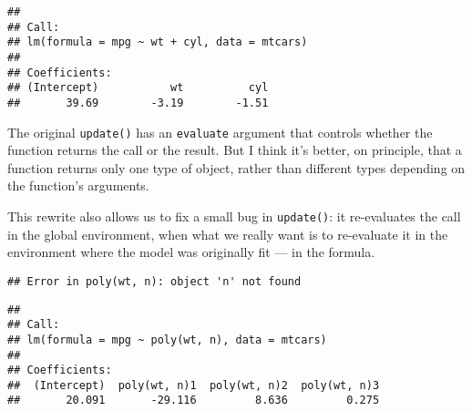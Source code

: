 \begin{verbatim}
## 
## Call:
## lm(formula = mpg ~ wt + cyl, data = mtcars)
## 
## Coefficients:
## (Intercept)           wt          cyl  
##       39.69        -3.19        -1.51
\end{verbatim}

The original \texttt{update()} has an \texttt{evaluate} argument that
controls whether the function returns the call or the result. But I
think it's better, on principle, that a function returns only one type
of object, rather than different types depending on the function's
arguments.

This rewrite also allows us to fix a small bug in \texttt{update()}: it
re-evaluates the call in the global environment, when what we really
want is to re-evaluate it in the environment where the model was
originally fit --- in the formula.

\begin{Shaded}
\begin{Highlighting}[]
\StringTok{ }\NormalTok{() \{}
\StringTok{ }
  \OperatorTok{~}\StringTok{ }
\NormalTok{\}}
\StringTok{ }\NormalTok{()}
\end{Highlighting}
\end{Shaded}

\begin{verbatim}
## Error in poly(wt, n): object 'n' not found
\end{verbatim}

\begin{Shaded}
\begin{Highlighting}[]
\StringTok{ }
\StringTok{ }
  \NormalTok{(}
\NormalTok{\}}
\end{Highlighting}
\end{Shaded}

\begin{verbatim}
## 
## Call:
## lm(formula = mpg ~ poly(wt, n), data = mtcars)
## 
## Coefficients:
##  (Intercept)  poly(wt, n)1  poly(wt, n)2  poly(wt, n)3  
##       20.091       -29.116         8.636         0.275
\end{verbatim}

